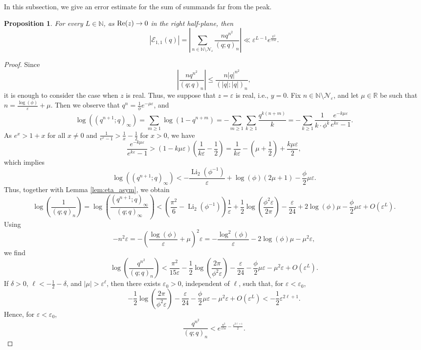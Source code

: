 \documentclass[11pt,reqno]{amsart}
\newtheorem{proposition}[theorem]{Proposition}
\theoremstyle{remark}
\numberwithin{equation}{section}
\def\Li{\operatorname{Li}}
\renewcommand{\Re}{{\rm Re}}
\renewcommand{\Re}{{\rm Re}}
\def\Li{\operatorname{Li}}
\begin{document}
In this subsection, we give an error estimate for the sum of summands far from the peak.
\begin{proposition}\label{prop:far}
	For every $L \in \mathbb{N}$, as $\Re(z) \to 0$ in the right half-plane, then
	\[
		\left| \mathcal{E}_{1,1}(q) \right| = \left|\sum_{n \in \mathbb{N} \setminus \mathcal{N}_{\varepsilon}}  \frac{nq^{n^2}}{(q;q)_n} \right| \ll \varepsilon^{L-1} e^{\frac{\pi^2}{15\varepsilon}}.
	\]
\end{proposition}
\begin{proof}
Since
\[
	\left| \frac{nq^{n^2}}{(q;q)_n} \right| \leq \frac{n|q|^{n^2}}{(|q|;|q|)_n}, 
\]
it is enough to consider the case when $z$ is real.
Thus, we suppose that $z=\varepsilon$ is real, i.e., $y=0$. Fix $n \in \mathbb{N} \setminus \mathcal{N}_{\varepsilon}$, and let $\mu \in \mathbb{R}$ be such that $n=\frac{\log(\phi)}{\varepsilon}+\mu$. Then we observe that $q^n=\frac{1}{\phi}e^{-\mu \varepsilon}$, and
\[
	\log\left((q^{n+1};q)_\infty \right) = \sum_{m \geq 1} \log\left(1-q^{n+m}\right) = -\sum_{m \geq 1}\sum_{k \geq 1}\frac{q^{k(n+m)}}{k} 
	= -\sum_{k \geq 1} \frac{1}{k \cdot \phi^k}\frac{e^{-k\mu\varepsilon}}{e^{k\varepsilon}-1}.
\]
As $e^x> 1+x$ for all $x \neq 0$ and $\frac{1}{e^x-1}>\frac{1}{x}-\frac{1}{2}$ for $x>0$, we have
\[
	\frac{e^{-k\mu\varepsilon}}{e^{k\varepsilon}-1} > (1-k\mu\varepsilon)\left(\frac{1}{k\varepsilon} -\frac12 \right) = \frac{1}{k\varepsilon} - \left( \mu +\frac12 \right) + \frac{k\mu \varepsilon}{2},
\]
which implies
\[
	\log\left((q^{n+1};q)_\infty \right)  < -\frac{\Li_2(\phi^{-1})}{\varepsilon} + \log(\phi)(2\mu+1) -\frac{\phi}{2} \mu\varepsilon.
\]
Thus, together with Lemma \ref{lem:eta_asym}, we obtain
\[
	\log \left(\frac{1}{(q;q)_n}\right)=\log\left(\frac{(q^{n+1};q)_\infty}{(q;q)_\infty} \right) <  \left(\frac{\pi^2}{6}-\Li_2(\phi^{-1})\right)\frac{1}{\varepsilon}  + \frac{1}{2} \log\left(\frac{\phi^2 \varepsilon}{2\pi} \right) - \frac{\varepsilon}{24} + 2\log(\phi) \mu -\frac{\phi}{2}\mu \varepsilon + O(\varepsilon^L). 
\]
Using
\[
	-n^2 \varepsilon = - \left( \frac{\log (\phi)}{\varepsilon} + \mu \right)^2 \varepsilon 
	= - \frac{\log^2 (\phi)}{\varepsilon}  - 2\log (\phi) \mu  - \mu^2 \varepsilon,
\]
we find 
\[
	\log\left(\frac{q^{n^2}}{(q;q)_n} \right) < \frac{\pi^2}{15\varepsilon} - \frac{1}{2} \log\left(\frac{2\pi}{\phi^2 \varepsilon} \right)  - \frac{\varepsilon}{24}  -\frac{\phi}{2} \mu\varepsilon - \mu^2 \varepsilon + O(\varepsilon^L). 
\]
If $\delta>0$, $\ell< -\frac12-\delta$, and $|\mu|>\varepsilon^\ell$, then there exists $\varepsilon_0>0$, independent of $\ell$, such that, for $\varepsilon < \varepsilon_0$,
\[
	- \frac{1}{2} \log\left(\frac{2\pi}{\phi^2 \varepsilon} \right)  - \frac{\varepsilon}{24}  -\frac{\phi}{2} \mu\varepsilon - \mu^2 \varepsilon + O(\varepsilon^L) < -\frac12 \varepsilon^{2\ell+1}.
\]
Hence, for $\varepsilon < \varepsilon_0$,
\begin{equation}\label{eq:summand_bound}
	\frac{q^{n^2}}{(q;q)_n} < e^{\frac{\pi^2}{15\varepsilon} -\frac{\varepsilon^{2\ell+1}}{2}}. 
\end{equation}


\end{proof}
\end{document}
